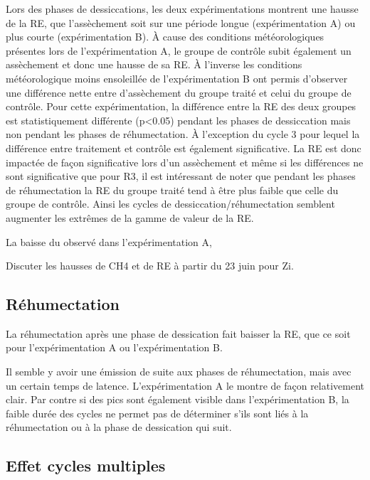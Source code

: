 Lors des phases de dessiccations, les deux expérimentations montrent une hausse de la RE, que l'assèchement soit sur une période longue (expérimentation A) ou plus courte (expérimentation B).
À cause des conditions météorologiques présentes lors de l'expérimentation A, le groupe de contrôle subit également un assèchement et donc une hausse de sa RE.
À l'inverse les conditions météorologique moins ensoleillée de l'expérimentation B ont permis d'observer une différence nette entre d'assèchement du groupe traité et celui du groupe de contrôle.
Pour cette expérimentation, la différence entre la RE des deux groupes est statistiquement différente (p<0.05) pendant les phases de dessiccation mais non pendant les phases de réhumectation.
À l'exception du cycle 3 pour lequel la différence entre traitement et contrôle est également significative.
La RE est donc impactée de façon significative lors d'un assèchement et même si les différences ne sont significative que pour R3, il est intéressant de noter que pendant les phases de réhumectation la RE du groupe traité tend à être plus faible que celle du groupe de contrôle.
Ainsi les cycles de dessiccation/réhumectation semblent augmenter les extrêmes de la gamme de valeur de la RE.

La baisse du \chh observé dans l'expérimentation A, 


Discuter les hausses de CH4 et de RE à partir du 23 juin pour Zi.

\subsection{Réhumectation}

La réhumectation après une phase de dessication fait baisser la RE, que ce soit pour l'expérimentation A ou l'expérimentation B.

Il semble y avoir une émission de \chh suite aux phases de réhumectation, mais avec un certain temps de latence.
L'expérimentation A le montre  de façon relativement clair.
Par contre si des pics sont également visible dans l'expérimentation B, la faible durée des cycles ne permet pas de déterminer s'ils sont liés à la réhumectation ou à la phase de dessication qui suit.

\subsection{Effet cycles multiples}
